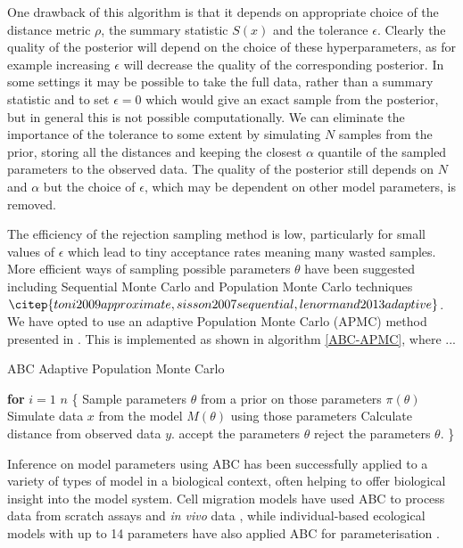\documentclass[twocolumn]{biophys}
\begin{document}
One drawback of this algorithm is that it depends on appropriate choice of the distance metric $\rho$, the summary statistic $S(x)$ and the tolerance $\epsilon $. 
Clearly the quality of the posterior will depend on the choice of these hyperparameters, as for example increasing $\epsilon $ will decrease the quality of the corresponding posterior.
In some settings it may be possible to take the full data, rather than a summary statistic and to set $\epsilon=0$ which would give an exact sample from the posterior, but in general this is not possible computationally. 
We can eliminate the importance of the tolerance to some extent by simulating $N$ samples from the prior, storing all the distances and keeping the closest $\alpha$ quantile of the sampled parameters to the observed data. 
The quality of the posterior still depends on $N$ and $\alpha$ but the choice of $\epsilon $, which may be dependent on other model parameters, is removed. 

The efficiency of the rejection sampling method is low, particularly for small values of $\epsilon$ which lead to tiny acceptance rates meaning many wasted samples. 
More efficient ways of sampling possible parameters $\theta$ have been suggested including Sequential Monte Carlo and Population Monte Carlo techniques $\citep{toni2009approximate, sisson2007sequential, lenormand2013adaptive}$.
We have opted to use an adaptive Population Monte Carlo (APMC) method presented in \citet{lenormand2013adaptive}. 
This is implemented as shown in algorithm \ref{ABC-APMC}, where ...
\begin{algorithm}
\caption{ABC Adaptive Population Monte Carlo}\label{ABC-APMC}
\begin{algorithmic}[1]
\State \textbf{for} $i=1$  $n$  \{
\State Sample parameters $\theta$ from a prior on those parameters $\pi (\theta)$ 
\State Simulate data $x$ from the model $M(\theta)$ using those parameters 
\State Calculate distance from observed data $y$.
 accept the parameters $\theta$
\Else \hspace{2pt} reject the parameters $\theta$.
\EndIf
\State \}
\end{algorithmic}
\end{algorithm}

Inference on model parameters using ABC has been successfully applied to a variety of types of model in a biological context, often helping to offer biological insight into the model system.
Cell migration models have used ABC to process data from scratch assays \citep{johnston2014interpreting} and \textit{in vivo} data \citep{liepe2012calibrating}, while individual-based ecological models with up to 14 parameters have also applied ABC for parameterisation \citep{van2015calibration}. 
\end{document}
